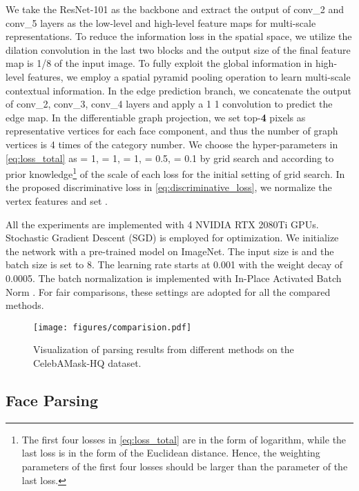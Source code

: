 We take the ResNet-101\cite{he2016deep} as the backbone and extract the output of conv\_2 and conv\_5 layers as the low-level and high-level feature maps for multi-scale representations. 
To reduce the information loss in the spatial space, we utilize the dilation convolution in the last two blocks and the output size of the final feature map is 1/8 of the input image. 
To fully exploit the global information in high-level features, we employ a spatial pyramid pooling operation \cite{zhao2017pyramid} to learn multi-scale contextual information. 
In the edge prediction branch, we concatenate the output of conv\_2, conv\_3, conv\_4 layers and apply a 1  1 convolution to predict the edge map. 
In the differentiable graph projection, we set top-\textbf{4} pixels as representative vertices for each face component, and thus the number of graph vertices is 4 times of the category number. 
We choose the hyper-parameters in \eqref{eq:loss_total} as  = 1,  = 1,  = 1,  = 0.5,  = 0.1 by grid search and according to prior knowledge\footnote{The first four losses in \eqref{eq:loss_total} are in the form of logarithm, while the last loss is in the form of the Euclidean distance. Hence, the weighting parameters of the first four losses should be larger than the parameter of the last loss.} of the scale of each loss for the initial setting of grid search.
In the proposed discriminative loss in \eqref{eq:discriminative_loss}, we normalize the vertex features and set .

All the experiments are implemented with 4 NVIDIA RTX 2080Ti GPUs. Stochastic Gradient Descent (SGD) is employed for optimization. We initialize the network with a pre-trained model on ImageNet. The input size is  and the batch size is set to 8. The learning rate starts at 0.001 with the weight decay of 0.0005. 
The batch normalization is implemented with In-Place Activated Batch Norm \cite{rotabulo2017place}.  For fair comparisons, these settings are adopted for all the compared methods.

\begin{figure*}[tbp]
    \centering
    \texttt{[image: figures/comparision.pdf]}
\caption{Visualization of parsing results from different methods on the CelebAMask-HQ dataset.}
    \label{fig:comparison}
\end{figure*}

\subsection{Face Parsing}

